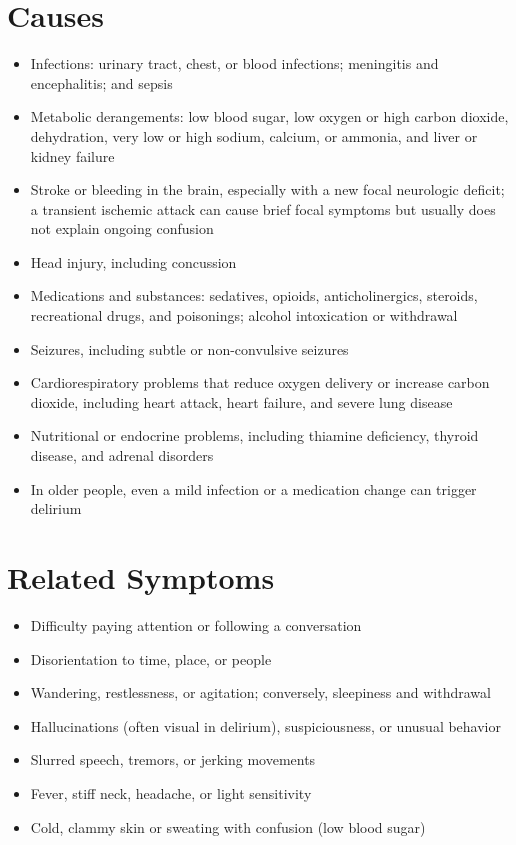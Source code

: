\section*{Causes}
\begin{itemize}
  \item Infections: urinary tract, chest, or blood infections; meningitis and encephalitis; and sepsis
  \item Metabolic derangements: low blood sugar, low oxygen or high carbon dioxide, dehydration, very low or high sodium, calcium, or ammonia, and liver or kidney failure
  \item Stroke or bleeding in the brain, especially with a new focal neurologic deficit; a transient ischemic attack can cause brief focal symptoms but usually does not explain ongoing confusion
  \item Head injury, including concussion
  \item Medications and substances: sedatives, opioids, anticholinergics, steroids, recreational drugs, and poisonings; alcohol intoxication or withdrawal
  \item Seizures, including subtle or non-convulsive seizures
  \item Cardiorespiratory problems that reduce oxygen delivery or increase carbon dioxide, including heart attack, heart failure, and severe lung disease
  \item Nutritional or endocrine problems, including thiamine deficiency, thyroid disease, and adrenal disorders
  \item In older people, even a mild infection or a medication change can trigger delirium
\end{itemize}

\section*{Related Symptoms}
\begin{itemize}
  \item Difficulty paying attention or following a conversation
  \item Disorientation to time, place, or people
  \item Wandering, restlessness, or agitation; conversely, sleepiness and withdrawal
  \item Hallucinations (often visual in delirium), suspiciousness, or unusual behavior
  \item Slurred speech, tremors, or jerking movements
  \item Fever, stiff neck, headache, or light sensitivity
  \item Cold, clammy skin or sweating with confusion (low blood sugar)
\end{itemize}

